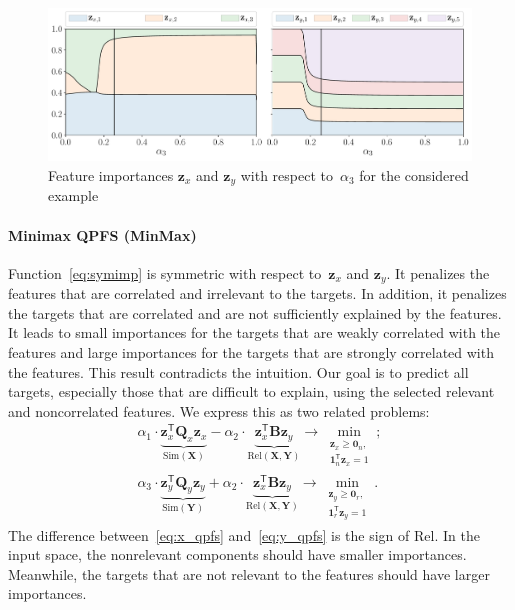 \documentclass[preprint,12pt]{elsarticle}
\theoremstyle{definition}
\newcommand{\bz}{\mathbf{z}}
\newcommand{\bY}{\mathbf{Y}}
\newcommand{\bX}{\mathbf{X}}
\newcommand{\bQ}{\mathbf{Q}}
\newcommand{\T}{\mathsf{T}}
\newcommand{\bOne}{\boldsymbol{1}}
\newcommand{\bZero}{\boldsymbol{0}}
\begin{document}
\begin{figure}
	\centering
	\includegraphics[width=\linewidth]{figs/features_vs_alpha.pdf}
	\caption{Feature importances $\bz_x$ and $\bz_y$ with respect to~$\alpha_3$ for the considered example}
	\label{fig:features_vs_alpha}
\end{figure}

\paragraph{Minimax QPFS (MinMax)}
Function~\eqref{eq:symimp} is symmetric with respect to~$\bz_x$ and $\bz_y$.
It penalizes the features that are correlated and irrelevant to the targets.
In addition, it penalizes the targets that are correlated and are not sufficiently explained by the features.
It leads to small importances for the targets that are weakly correlated with the features and large importances for the targets that are strongly correlated with the features.
This result contradicts the intuition.
Our goal is to predict all targets, especially those that are difficult to explain, using the selected relevant and noncorrelated features. We express this as two related problems:
\begin{align}
\alpha_1 \cdot \underbrace{\bz_x^{\T} \bQ_x \bz_x}_{\text{Sim}(\bX)} - \alpha_2 \cdot \underbrace{ \bz_x^{\T}\mathbf{B} \bz_y}_{\text{Rel}(\bX, \bY)} \rightarrow \min_{\substack{\bz_x \geq \bZero_n, \\ \bOne_n^{\T}\bz_x=1}};
\label{eq:x_qpfs}\\
\alpha_3 \cdot \underbrace{\bz_y^{\T} \bQ_y \bz_y}_{\text{Sim}(\bY)} + \alpha_2 \cdot \underbrace{ \bz_x^{\T} \mathbf{B} \bz_y}_{\text{Rel}(\bX, \bY)} \rightarrow \min_{\substack{\bz_y \geq \bZero_r,  \\ \bOne_r^{\T}\bz_y=1}}.
\label{eq:y_qpfs}
\end{align}
The difference between~\eqref{eq:x_qpfs} and~\eqref{eq:y_qpfs} is the sign of Rel.
In the input space, the nonrelevant components should have smaller importances.
Meanwhile, the targets that are not relevant to the features should have larger importances.
\end{document}
